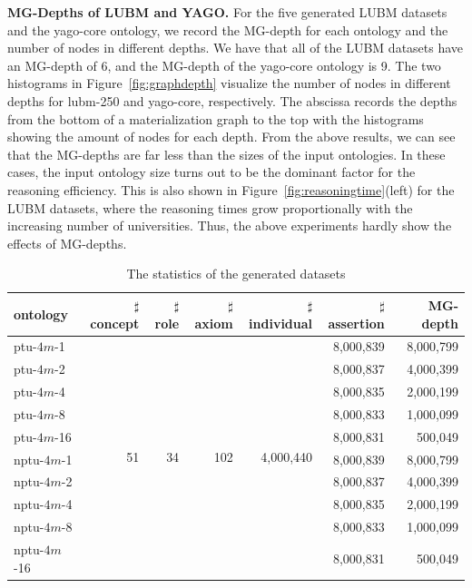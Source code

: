 \textbf{MG-Depths of LUBM and YAGO.}
For the five generated LUBM datasets and the yago-core ontology, we record the MG-depth
for each ontology and the number of nodes in different depths.
We have that all of the LUBM datasets have an MG-depth of 6,
and the MG-depth of the yago-core ontology is 9.
The two histograms in Figure~\ref{fig:graphdepth} visualize the number
of nodes in different depths for lubm-250 and yago-core,
respectively.
The abscissa records the depths from the bottom of a materialization
graph to the top with
the histograms showing the amount of nodes for each depth.
%
From the above results, we can see that the MG-depths are far less than
the sizes of the input ontologies. In these cases, the input ontology size
turns out to be the dominant factor for the reasoning efficiency.
This is also shown in Figure~\ref{fig:reasoningtime}(left) for the LUBM datasets,
where the reasoning times grow proportionally with the increasing number
of universities.
%
Thus, the above experiments hardly show the effects of MG-depths.

\begin{table}
\centering
\caption{The statistics of the generated datasets}
\begin{tabular}{|l|r|r|r|r|r|r|}
\hline
ontology&$\sharp$concept&$\sharp$role&$\sharp$axiom&$\sharp$individual&$\sharp$assertion&MG-depth\\
\hline
ptu-$4m$-1&\multirow{10}{*}{51}&\multirow{10}{*}{34}&\multirow{10}{*}{102}&\multirow{10}{*}{4,000,440}&8,000,839&8,000,799\\
ptu-$4m$-2&&&&&8,000,837&4,000,399\\
ptu-$4m$-4&&&&&8,000,835&2,000,199\\
ptu-$4m$-8&&&&&8,000,833&1,000,099\\
ptu-$4m$-16&&&&&8,000,831&500,049\\
nptu-$4m$-1&&&&&8,000,839&8,000,799\\
nptu-$4m$-2&&&&&8,000,837&4,000,399\\
nptu-$4m$-4&&&&&8,000,835&2,000,199\\
nptu-$4m$-8&&&&&8,000,833&1,000,099\\
nptu-$4m$-16&&&&&8,000,831&500,049\\
\hline
\end{tabular}
\label{tab:generated}
\end{table}

